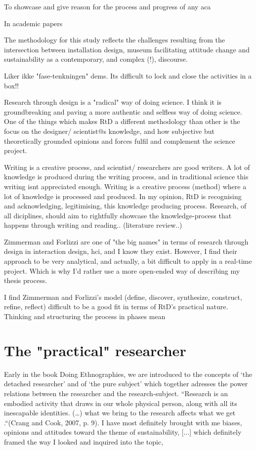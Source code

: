 To showcase and give reason for the process and progress of any aca

In academic papers



The methodology for this study reflects the challenges resulting from the intersection between installation design, museum facilitating attitude change and sustainability as a contemporary, and complex (!), discourse. 

Liker ikke "fase-tenkningen" dems. Its difficult to lock and close the activities in a box!!

Research through design is a "radical" way of doing science. I think it is groundbreaking and paving a more authentic and selfless way of doing science. One of the things which makes RtD a different methodology than other is the focus on the designer/ scientist@s knowledge, and how subjective but theoretically grounded opinions and forces fulfil and complement the science project. 

Writing is a creative process, and scientist/ researchers are good writers. A lot of knowledge is produced during the writing process, and in traditional science this writing isnt appreciated enough. Writing is a creative process (method) where a lot of knowledge is processed and produced. In my opinion, RtD is recognising and acknowledging, legitimising, this knowledge producing process. Research, of all diciplines, should aim to rightfully showcase the knowledge-process that happens through writing and reading..  (literature review..)

Zimmerman and Forlizzi are one of "the big names" in terms of research through design in interaction design, hci, and I know they exist. However, I find their approach to be very analytical, and actually, a bit difficult to apply in a real-time project. Which is why I'd rather use a more open-ended way of describing my thesis process. 

I find Zimmerman and Forlizzi's model (define, discover, synthesize, construct, refine, reflect) difficult to be a good fit in terms of RtD's practical nature. Thinking and structuring the process in phases mean 



\section{The "practical" researcher}
Early in the book Doing Ethnographies, we are introduced to the concepts of ‘the detached researcher’ and of ‘the pure subject’ which together adresses the power relations between the researcher and the research-subject. “Research is an embodied activity that draws in our whole physical person, along with all its inescapable identities. (…) what we bring to the research affects what we get .“(Crang and Cook, 2007, p. 9). I have most definitely brought with me biases, opinions and attitudes toward the theme of sustainability, [...] which definitely framed the way I looked and inquired into the topic,


